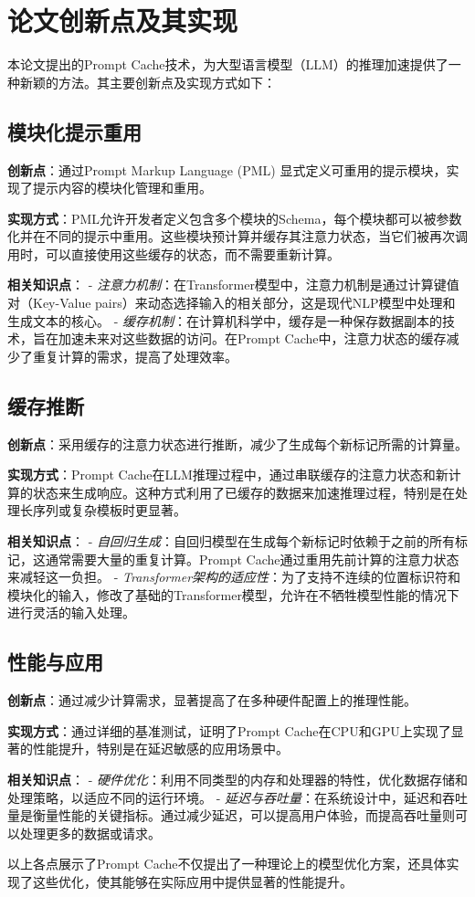 \documentclass[twocolumn, 10pt]{article} %
\theoremstyle{remark}
\begin{document}
\section{论文创新点及其实现}

本论文提出的Prompt Cache技术，为大型语言模型（LLM）的推理加速提供了一种新颖的方法。其主要创新点及实现方式如下：

\subsection{模块化提示重用}

\textbf{创新点}：通过Prompt Markup Language (PML) 显式定义可重用的提示模块，实现了提示内容的模块化管理和重用。

\textbf{实现方式}：PML允许开发者定义包含多个模块的Schema，每个模块都可以被参数化并在不同的提示中重用。这些模块预计算并缓存其注意力状态，当它们被再次调用时，可以直接使用这些缓存的状态，而不需要重新计算。

\textbf{相关知识点}：
- \textit{注意力机制}：在Transformer模型中，注意力机制是通过计算键值对（Key-Value pairs）来动态选择输入的相关部分，这是现代NLP模型中处理和生成文本的核心。
- \textit{缓存机制}：在计算机科学中，缓存是一种保存数据副本的技术，旨在加速未来对这些数据的访问。在Prompt Cache中，注意力状态的缓存减少了重复计算的需求，提高了处理效率。

\subsection{缓存推断}

\textbf{创新点}：采用缓存的注意力状态进行推断，减少了生成每个新标记所需的计算量。

\textbf{实现方式}：Prompt Cache在LLM推理过程中，通过串联缓存的注意力状态和新计算的状态来生成响应。这种方式利用了已缓存的数据来加速推理过程，特别是在处理长序列或复杂模板时更显著。

\textbf{相关知识点}：
- \textit{自回归生成}：自回归模型在生成每个新标记时依赖于之前的所有标记，这通常需要大量的重复计算。Prompt Cache通过重用先前计算的注意力状态来减轻这一负担。
- \textit{Transformer架构的适应性}：为了支持不连续的位置标识符和模块化的输入，修改了基础的Transformer模型，允许在不牺牲模型性能的情况下进行灵活的输入处理。

\subsection{性能与应用}

\textbf{创新点}：通过减少计算需求，显著提高了在多种硬件配置上的推理性能。

\textbf{实现方式}：通过详细的基准测试，证明了Prompt Cache在CPU和GPU上实现了显著的性能提升，特别是在延迟敏感的应用场景中。

\textbf{相关知识点}：
- \textit{硬件优化}：利用不同类型的内存和处理器的特性，优化数据存储和处理策略，以适应不同的运行环境。
- \textit{延迟与吞吐量}：在系统设计中，延迟和吞吐量是衡量性能的关键指标。通过减少延迟，可以提高用户体验，而提高吞吐量则可以处理更多的数据或请求。

以上各点展示了Prompt Cache不仅提出了一种理论上的模型优化方案，还具体实现了这些优化，使其能够在实际应用中提供显著的性能提升。
\end{document}
